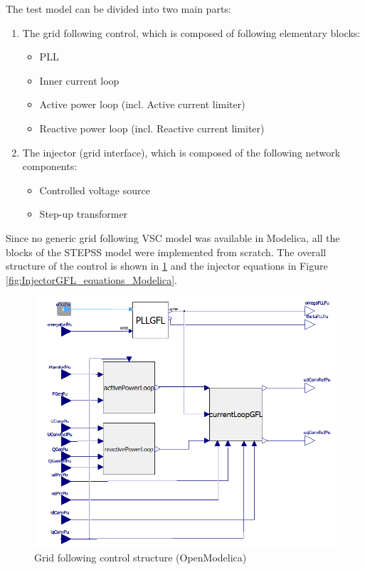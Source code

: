 \documentclass{report}
\begin{document}
The test model can be divided into two main parts:
\begin{enumerate}
\item The grid following control, which is composed of following elementary blocks:
\begin{itemize}
    \item PLL
    \item Inner current loop
    \item Active power loop (incl. Active current limiter)
    \item Reactive power loop (incl. Reactive current limiter)
\end{itemize}
\item The injector (grid interface), which is composed of the following network components:
\begin{itemize}
    \item Controlled voltage source
    \item Step-up transformer
\end{itemize}
\end{enumerate}

Since no generic grid following VSC model was available in Modelica, all the blocks of the STEPSS model were implemented from scratch. The overall structure of the control is shown in \ref{fig:GFLcontrol_Modelica} and the injector equations in Figure \ref{fig:InjectorGFL_equations_Modelica}.

\begin{figure}[H]
    \centering
    \includegraphics[scale = 0.4]{Figure_1VSC/GFLcontrol_Modelica.PNG}
    \caption{Grid following control structure (OpenModelica)}
    \label{fig:GFLcontrol_Modelica}
\end{figure}
\end{document}
